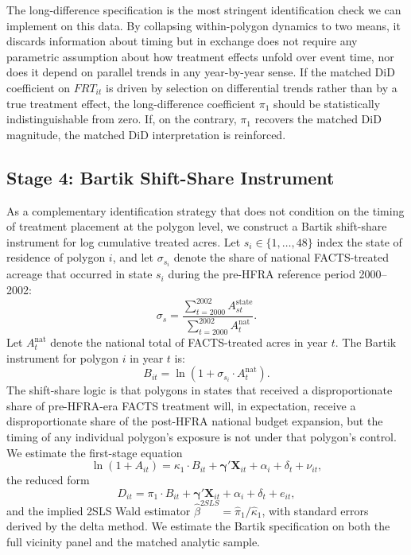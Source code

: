 \documentclass[12pt, letterpaper]{article}
\begin{document}
The long-difference specification is the most stringent identification check we can implement on this data. By collapsing within-polygon dynamics to two means, it discards information about timing but in exchange does not require any parametric assumption about how treatment effects unfold over event time, nor does it depend on parallel trends in any year-by-year sense. If the matched DiD coefficient on $FRT_{it}$ is driven by selection on differential trends rather than by a true treatment effect, the long-difference coefficient $\pi_1$ should be statistically indistinguishable from zero. If, on the contrary, $\pi_1$ recovers the matched DiD magnitude, the matched DiD interpretation is reinforced.

\subsection{Stage 4: Bartik Shift-Share Instrument}\label{sec:bartik}

As a complementary identification strategy that does not condition on the timing of treatment placement at the polygon level, we construct a Bartik shift-share instrument for log cumulative treated acres. Let $s_i \in \{1, \ldots, 48\}$ index the state of residence of polygon $i$, and let $\sigma_{s_i}$ denote the share of national FACTS-treated acreage that occurred in state $s_i$ during the pre-HFRA reference period 2000--2002:
\begin{equation}
\sigma_s = \frac{\sum_{t=2000}^{2002} A_{st}^{\text{state}}}{\sum_{t=2000}^{2002} A_t^{\text{nat}}}.
\label{eq:state_share}
\end{equation}
Let $A_t^{\text{nat}}$ denote the national total of FACTS-treated acres in year $t$. The Bartik instrument for polygon $i$ in year $t$ is:
\begin{equation}
B_{it} = \ln\!\left(1 + \sigma_{s_i} \cdot A_t^{\text{nat}}\right).
\label{eq:bartik}
\end{equation}
The shift-share logic is that polygons in states that received a disproportionate share of pre-HFRA-era FACTS treatment will, in expectation, receive a disproportionate share of the post-HFRA national budget expansion, but the timing of any individual polygon's exposure is not under that polygon's control. We estimate the first-stage equation
\begin{equation}
\ln(1 + A_{it}) = \kappa_1 \cdot B_{it} + \boldsymbol{\gamma}' \mathbf{X}_{it} + \alpha_i + \delta_t + \nu_{it},
\label{eq:firststage}
\end{equation}
the reduced form
\begin{equation}
D_{it} = \pi_1 \cdot B_{it} + \boldsymbol{\gamma}' \mathbf{X}_{it} + \alpha_i + \delta_t + e_{it},
\label{eq:reducedform}
\end{equation}
and the implied 2SLS Wald estimator $\hat{\beta}^{2SLS} = \hat{\pi}_1 / \hat{\kappa}_1$, with standard errors derived by the delta method. We estimate the Bartik specification on both the full vicinity panel and the matched analytic sample.
\end{document}
